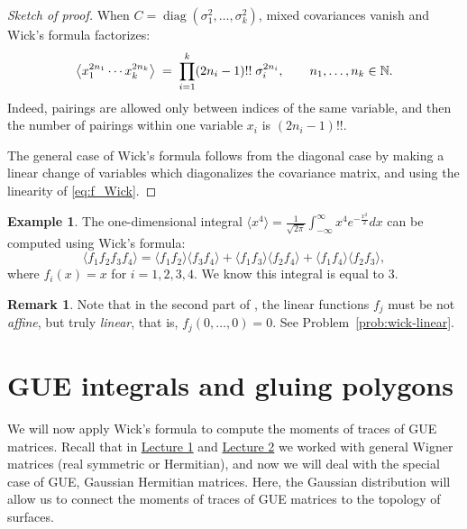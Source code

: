 \documentclass[letterpaper,11pt,oneside,reqno]{article}
\numberwithin{equation}{section}
\theoremstyle{definition}
\newtheorem{remark}[proposition]{Remark}
\newtheorem{example}[proposition]{Example}
\begin{document}
\begin{proof}[Sketch of proof]
	When $C=\operatorname{diag}(\sigma_{1}^{2},\dots,\sigma_{k}^{2})$,
mixed covariances vanish and Wick’s formula factorizes:
\begin{equation*}
  \bigl\langle
     x_{1}^{2n_{1}}\cdots x_{k}^{2n_{k}}
  \bigr\rangle
  \;=\;
  \prod_{i=1}^{k}
    (2n_{i}-1)!!\;\sigma_{i}^{2n_{i}},
  \qquad n_{1},\dots,n_{k}\in\Bbb N.
  \label{eq:wick-diagonal}
\end{equation*}
Indeed, pairings are allowed only between indices of the same variable,
and then the number of pairings within one variable $x_i$ is $(2n_i-1)!!$.

The general case of Wick’s formula follows from the diagonal case by
making a linear change of variables which diagonalizes the covariance matrix, and using the linearity of
\eqref{eq:f_Wick}.
\end{proof}

\begin{example}
	The one-dimensional integral
	$\langle  x^4 \rangle =\frac{1}{\sqrt{2\pi}} \int_{-\infty}^{\infty} x^4 e^{-\frac{x^2}{2}} dx$ can be computed using Wick’s formula:
	\begin{equation*}
		\langle f_1f_2f_3f_4 \rangle =
		\langle f_1f_2 \rangle \langle f_3f_4 \rangle + \langle f_1f_3 \rangle \langle f_2f_4 \rangle + \langle f_1f_4 \rangle \langle f_2f_3 \rangle,
	\end{equation*}
	where $f_i(x)=x$ for $i=1,2,3,4$.
	We know this integral is equal to $3$.
\end{example}

\begin{remark}
	\label{rem:wick-linear}
	Note that in the second part of ,
	the linear functions $f_j$ must be not \emph{affine}, but truly \emph{linear},
	that is, $f_j(0,\ldots,0)=0$. See Problem~\ref{prob:wick-linear}.
\end{remark}


\section{GUE integrals and gluing polygons}

We will now apply Wick’s formula to compute the moments of traces of
GUE matrices. Recall that in
\href{https://lpetrov.cc/rmt25/rmt25-notes/rmt2025-l01.pdf}{Lecture 1}
and
\href{https://lpetrov.cc/rmt25/rmt25-notes/rmt2025-l02.pdf}{Lecture 2} we
worked with general Wigner matrices (real symmetric or Hermitian),
and now we will deal with the special case of
GUE, Gaussian Hermitian matrices.
Here, the Gaussian distribution will allow us to
connect the moments of traces of GUE matrices to the topology of surfaces.
\end{document}
